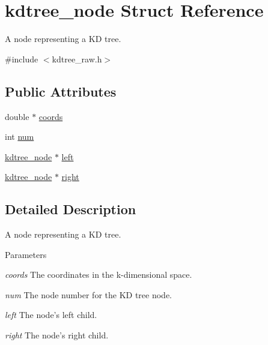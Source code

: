 \hypertarget{structkdtree__node}{
\section{kdtree\_\-node Struct Reference}
\label{structkdtree__node}
}


A node representing a KD tree.  




{\ttfamily \#include $<$kdtree\_\-raw.h$>$}

\subsection*{Public Attributes}
\begin{DoxyCompactItemize}
\item 
double $\ast$ \hyperlink{structkdtree__node_af9d6e47a477977efc10800b445eea090}{coords}
\item 
int \hyperlink{structkdtree__node_a6ebf3daf8c8d9c6786bba91e3feceaf4}{num}
\item 
\hyperlink{structkdtree__node}{kdtree\_\-node} $\ast$ \hyperlink{structkdtree__node_a2c1ec29109a9360a437aa18c4dc2a2a3}{left}
\item 
\hyperlink{structkdtree__node}{kdtree\_\-node} $\ast$ \hyperlink{structkdtree__node_adab509b4b43648703b9938bca292df52}{right}
\end{DoxyCompactItemize}


\subsection{Detailed Description}
A node representing a KD tree. 
\begin{DoxyParams}{Parameters}
\item[{\em coords}]The coordinates in the k-\/dimensional space. \item[{\em num}]The node number for the KD tree node. \item[{\em left}]The node's left child. \item[{\em right}]The node's right child. \end{DoxyParams}


